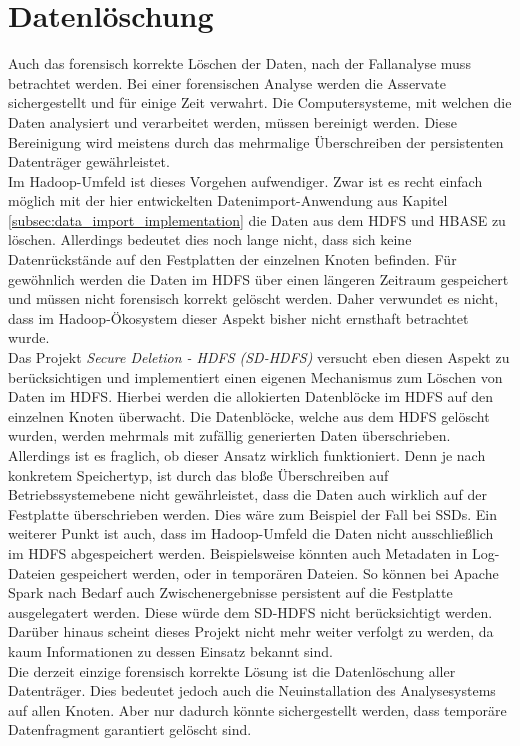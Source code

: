 \section{Datenlöschung}
Auch das forensisch korrekte Löschen der Daten, nach der Fallanalyse muss betrachtet werden. Bei einer forensischen Analyse werden die Asservate sichergestellt und für einige Zeit verwahrt. Die Computersysteme, mit welchen die Daten analysiert und verarbeitet werden, müssen bereinigt werden. Diese Bereinigung wird meistens durch das mehrmalige Überschreiben der persistenten Datenträger gewährleistet.\\ Im Hadoop-Umfeld ist dieses Vorgehen aufwendiger. Zwar ist es recht einfach möglich mit der hier entwickelten Datenimport-Anwendung aus Kapitel \ref{subsec:data_import_implementation} die Daten aus dem HDFS und HBASE zu löschen. Allerdings bedeutet dies noch lange nicht, dass sich keine Datenrückstände auf den Festplatten der einzelnen Knoten befinden.
Für gewöhnlich werden die Daten im HDFS über einen längeren Zeitraum gespeichert und müssen nicht forensisch korrekt gelöscht werden. Daher verwundet es nicht, dass im Hadoop-Ökosystem dieser Aspekt bisher nicht ernsthaft betrachtet wurde.\\
Das Projekt \textit{Secure Deletion - HDFS (SD-HDFS)} versucht eben diesen Aspekt zu berücksichtigen und implementiert einen eigenen Mechanismus zum Löschen von Daten im HDFS.\cite{sd_hdfs} Hierbei werden die allokierten Datenblöcke im HDFS auf den einzelnen Knoten überwacht. Die Datenblöcke, welche aus dem HDFS gelöscht wurden, werden mehrmals mit zufällig generierten Daten überschrieben. Allerdings ist es fraglich, ob dieser Ansatz wirklich funktioniert. Denn je nach konkretem Speichertyp, ist durch das bloße Überschreiben auf Betriebssystemebene nicht gewährleistet, dass die Daten auch wirklich auf der Festplatte überschrieben werden. Dies wäre zum Beispiel der Fall bei SSDs. Ein weiterer Punkt ist auch, dass im Hadoop-Umfeld die Daten nicht ausschließlich im HDFS abgespeichert werden. Beispielsweise könnten auch Metadaten in Log-Dateien gespeichert werden, oder in temporären Dateien. So können bei Apache Spark nach Bedarf auch Zwischenergebnisse persistent auf die Festplatte ausgelegatert werden.\cite{spark_rdd} Diese würde dem SD-HDFS nicht berücksichtigt werden. Darüber hinaus scheint dieses Projekt nicht mehr weiter verfolgt zu werden, da kaum Informationen zu dessen Einsatz bekannt sind.\\

\noindent
Die  derzeit einzige forensisch korrekte Lösung ist die Datenlöschung aller Datenträger. Dies bedeutet jedoch auch die Neuinstallation des Analysesystems auf allen Knoten. Aber nur dadurch könnte sichergestellt werden, dass temporäre Datenfragment garantiert gelöscht sind.  